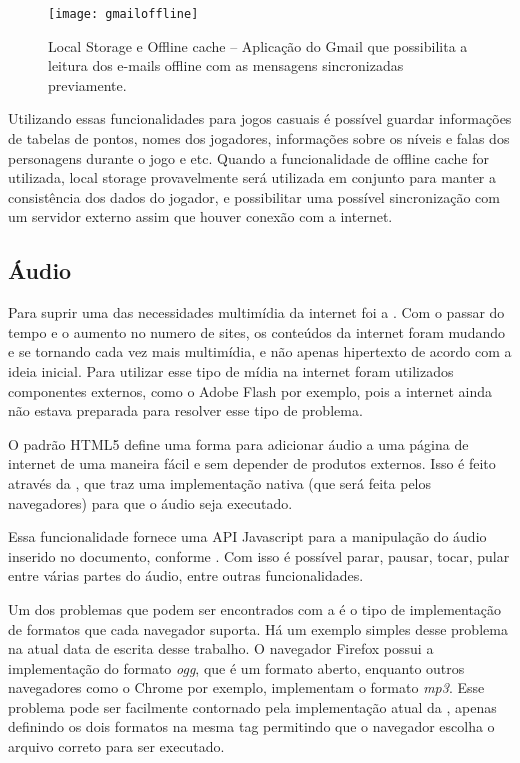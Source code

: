\begin{figure}[H]
  \centering
	\texttt{[image: gmailoffline]}
  \caption{Local Storage e Offline cache {--} Aplicação do Gmail que possibilita a
  leitura dos e-mails offline com as mensagens sincronizadas
  previamente.}
  \label{img:gmailoffline}
\end{figure}

Utilizando essas funcionalidades para jogos casuais é possível
guardar informações de tabelas de pontos, nomes dos jogadores,
informações sobre os níveis e falas dos personagens durante o jogo e
etc. Quando a funcionalidade de offline cache for utilizada, local
storage provavelmente será utilizada em conjunto para manter a
consistência dos dados do jogador, e possibilitar uma possível
sincronização com um servidor externo assim que houver conexão com a
internet.

\subsection{Áudio}
Para suprir uma das necessidades multimídia
da internet foi a \tagaudio. Com o passar do tempo e o aumento no
numero de sites, os conteúdos da internet foram mudando
e se tornando cada vez mais multimídia, e não apenas hipertexto de
acordo com a ideia inicial. Para utilizar esse tipo de mídia na
internet foram utilizados componentes externos, como o Adobe Flash por
exemplo, pois a internet ainda não estava preparada para resolver esse
tipo de problema.

O padrão HTML5 define uma forma para adicionar áudio a uma página de
internet de uma maneira fácil e sem depender de produtos externos.
Isso é feito através da \tagaudio, que traz uma
implementação nativa (que será feita pelos navegadores) para que o
áudio seja executado.

Essa funcionalidade fornece uma API Javascript para a manipulação do
áudio inserido no documento, conforme
.
Com isso é possível parar, pausar, tocar,
pular entre várias partes do áudio, entre outras funcionalidades.

Um dos problemas que podem ser encontrados com a \tagaudio  é o tipo de
implementação de formatos que cada navegador suporta. Há um exemplo
simples desse problema na atual data de escrita desse trabalho. O
navegador Firefox possui a implementação do formato \textit{ogg}, que
é um formato aberto, enquanto outros navegadores como o Chrome por
exemplo, implementam o formato \textit{mp3}. Esse problema pode ser
facilmente contornado pela implementação atual da \tagaudio,
apenas definindo os dois formatos na mesma tag permitindo que o
navegador escolha o arquivo correto para ser executado.

